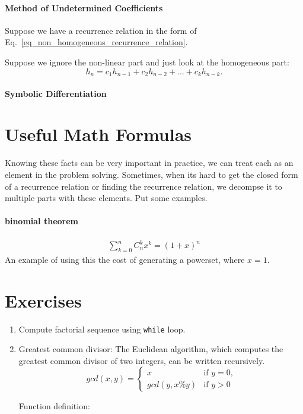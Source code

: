 \documentclass[../main.tex]{subfiles}
\begin{document}
\paragraph{Method of Undetermined Coefficients} Suppose we have a recurrence relation in the form of Eq.~\ref{eq_non_homogeneous_recurrence_relation}. 

Suppose we ignore the non-linear part and just look at the homogeneous part:
\begin{equation}
    h_n=c_1h_{n-1} + c_2h_{n-2} + ... + c_k h_{n-k}.
    \label{eq_non_homogeneous_recurrence_relation_2}
\end{equation}

\paragraph{Symbolic Differentiation}



\section{Useful Math Formulas}
Knowing these facts can be very important in practice, we can treat each as an element in the problem solving. Sometimes, when its hard to get the closed form of a recurrence relation or finding the recurrence relation, we decompse it to multiple parts with these elements. Put some examples. 
\paragraph{binomial theorem}
\begin{align}
    \sum_{k=0}^{n}C_{n}^{k}x^k = (1+x)^n
\end{align}
An example of using this the cost of generating a powerset, where $x=1$.
\section{Exercises}
\begin{enumerate}
    \item Compute factorial sequence using \texttt{while} loop.
    \item Greatest common divisor: The Euclidean algorithm, which computes the greatest common divisor of two integers, can be written recursively.
    \begin{equation}
            gcd(x, y)=
        \begin{cases}
  x & \text{if $y=0$,}\\
  gcd(y, x\% y) & \text{if $y>0$}
\end{cases}
    \end{equation}

Function definition: 
\end{enumerate}
\end{document}
